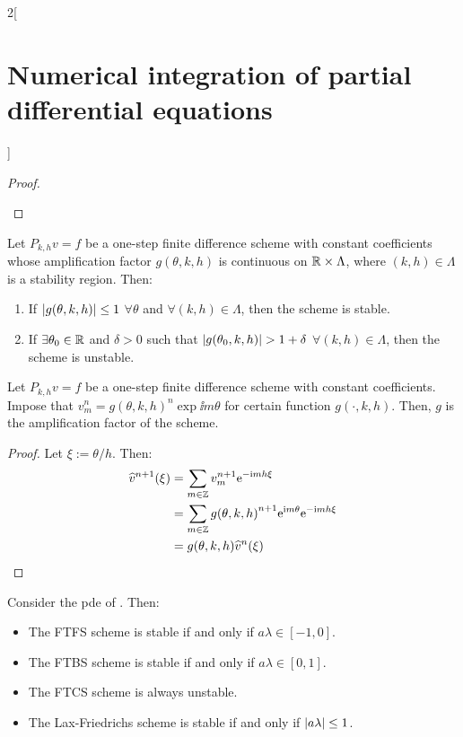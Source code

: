 \documentclass[../../../main_math.tex]{subfiles}
\begin{document}
\begin{multicols}{2}[\section{Numerical integration of partial differential equations}]
\begin{proof}
\begin{enumerate}
    \end{enumerate}
  \end{proof}
  \begin{corollary}
    Let $P_{k,h}{v}={f}$ be a one-step finite difference scheme with constant coefficients whose amplification factor $g(\theta,k,h)$ is continuous on $\mathbb{R}\times\Lambda$, where $(k,h)\in\Lambda$ is a stability region. Then:
    \begin{enumerate}
      \item If $\abs{g(\theta,k,h)}\leq 1$ $\forall \theta$ and $\forall(k,h)\in\Lambda$, then the scheme is stable.
      \item If $\exists\theta_0\in\mathbb{R}$ and $\delta>0$ such that $\abs{g(\theta_0,k,h)}>1+\delta$ $\forall(k,h)\in\Lambda$, then the scheme is unstable.
    \end{enumerate}
  \end{corollary}
  \begin{lemma}
    Let $P_{k,h}{v}={f}$ be a one-step finite difference scheme with constant coefficients. Impose that $v_m^n= {g(\theta,k,h)}^n\exp{\ii m\theta}$ for certain function $g(\cdot,k,h)$. Then, $g$ is the amplification factor of the scheme.
  \end{lemma}
  \begin{proof}Let $\xi:=\theta/h$. Then:
    \begin{align*}
      \widehat{v}^{n+1}(\xi) & =\sum_{m\in\mathbb{Z}} v_m^{n+1}\mathrm{e}^{-\mathrm{i} mh\xi}                              \\
                             & =\sum_{m\in\mathbb{Z}} {g(\theta,k,h)}^{n+1}\mathrm{e}^{\mathrm{i} m\theta}\mathrm{e}^{-\mathrm{i} mh\xi} \\
                             & =g(\theta,k,h)\widehat{v}^n(\xi)
    \end{align*}
  \end{proof}
  \begin{proposition}
    Consider the pde of . Then:
    \begin{itemize}
      \item The FTFS scheme is stable if and only if $a\lambda\in [-1,0]$.
      \item The FTBS scheme is stable if and only if $a\lambda\in [0,1]$.
      \item The FTCS scheme is always unstable.
      \item The Lax-Friedrichs scheme is stable if and only if $\abs{a\lambda}\leq 1$.
    \end{itemize}
  \end{proposition}

\end{multicols}
\end{document}
